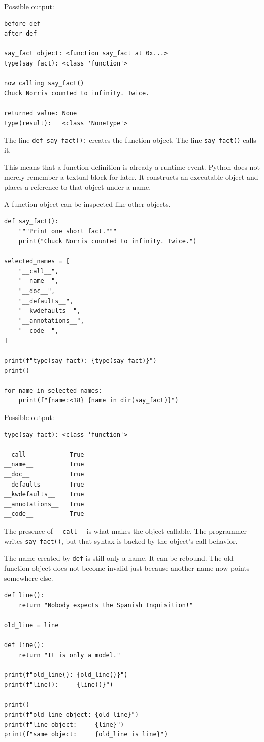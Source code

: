 Possible output:

\begin{verbatim}
before def
after def

say_fact object: <function say_fact at 0x...>
type(say_fact): <class 'function'>

now calling say_fact()
Chuck Norris counted to infinity. Twice.

returned value: None
type(result):   <class 'NoneType'>
\end{verbatim}

The line \texttt{def say\_fact():} creates the function object. The line \texttt{say\_fact()} calls it.

This means that a function definition is already a runtime event. Python does not merely remember a textual block for later. It constructs an executable object and places a reference to that object under a name.

A function object can be inspected like other objects.

\begin{verbatim}
def say_fact():
    """Print one short fact."""
    print("Chuck Norris counted to infinity. Twice.")

selected_names = [
    "__call__",
    "__name__",
    "__doc__",
    "__defaults__",
    "__kwdefaults__",
    "__annotations__",
    "__code__",
]

print(f"type(say_fact): {type(say_fact)}")
print()

for name in selected_names:
    print(f"{name:<18} {name in dir(say_fact)}")
\end{verbatim}

Possible output:

\begin{verbatim}
type(say_fact): <class 'function'>

__call__          True
__name__          True
__doc__           True
__defaults__      True
__kwdefaults__    True
__annotations__   True
__code__          True
\end{verbatim}

The presence of \texttt{\_\_call\_\_} is what makes the object callable. The programmer writes \texttt{say\_fact()}, but that syntax is backed by the object's call behavior.

The name created by \texttt{def} is still only a name. It can be rebound. The old function object does not become invalid just because another name now points somewhere else.

\begin{verbatim}
def line():
    return "Nobody expects the Spanish Inquisition!"

old_line = line

def line():
    return "It is only a model."

print(f"old_line(): {old_line()}")
print(f"line():     {line()}")

print()
print(f"old_line object: {old_line}")
print(f"line object:     {line}")
print(f"same object:     {old_line is line}")
\end{verbatim}

